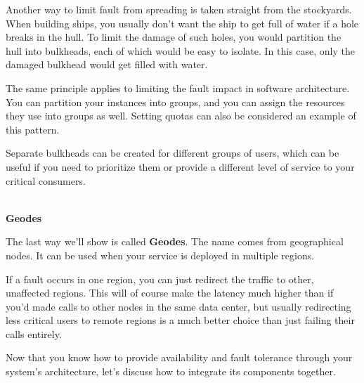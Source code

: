 Another way to limit fault from spreading is taken straight from the stockyards. When building ships, you usually don't want the ship to get full of water if a hole breaks in the hull. To limit the damage of such holes, you would partition the hull into bulkheads, each of which would be easy to isolate. In this case, only the damaged bulkhead would get filled with water.

The same principle applies to limiting the fault impact in software architecture. You can partition your instances into groups, and you can assign the resources they use into groups as well. Setting quotas can also be considered an example of this pattern.

Separate bulkheads can be created for different groups of users, which can be useful if you need to prioritize them or provide a different level of service to your critical consumers.

\hspace*{\fill} \\ %
\noindent
\textbf{Geodes}

The last way we'll show is called \textbf{Geodes}. The name comes from geographical nodes. It can be used when your service is deployed in multiple regions.

If a fault occurs in one region, you can just redirect the traffic to other, unaffected regions. This will of course make the latency much higher than if you'd made calls to other nodes in the same data center, but usually redirecting less critical users to remote regions is a much better choice than just failing their calls entirely.

Now that you know how to provide availability and fault tolerance through your system's architecture, let's discuss how to integrate its components together.





















